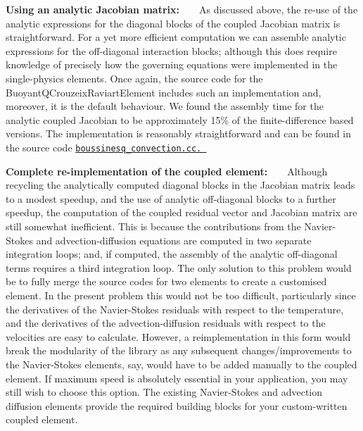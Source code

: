 \begin{DoxyItemize}
\begin{DoxyEnumerate}
\item {\bfseries Using an analytic Jacobian matrix\+:} ~\newline
~\newline
 As discussed above, the re-\/use of the analytic expressions for the diagonal blocks of the coupled Jacobian matrix is straightforward. For a yet more efficient computation we can assemble analytic expressions for the off-\/diagonal interaction blocks; although this does require knowledge of precisely how the governing equations were implemented in the single-\/physics elements. Once again, the source code for the {\ttfamily Buoyant\+Q\+Crouzeix\+Raviart\+Element} includes such an implementation and, moreover, it is the default behaviour. We found the assembly time for the analytic coupled Jacobian to be approximately 15\% of the finite-\/difference based versions. The implementation is reasonably straightforward and can be found in the source code \href{../../../../demo_drivers/multi_physics/boussinesq_convection/boussinesq_convection.cc}{\tt boussinesq\+\_\+convection.\+cc. } ~\newline
~\newline

\item {\bfseries Complete re-\/implementation of the coupled element\+:} ~\newline
~\newline
 Although recycling the analytically computed diagonal blocks in the Jacobian matrix leads to a modest speedup, and the use of analytic off-\/diagonal blocks to a further speedup, the computation of the coupled residual vector and Jacobian matrix are still somewhat inefficient. This is because the contributions from the Navier-\/\+Stokes and advection-\/diffusion equations are computed in two separate integration loops; and, if computed, the assembly of the analytic off-\/diagonal terms requires a third integration loop. The only solution to this problem would be to fully merge the source codes for two elements to create a customised element. In the present problem this would not be too difficult, particularly since the derivatives of the Navier-\/\+Stokes residuals with respect to the temperature, and the derivatives of the advection-\/diffusion residuals with respect to the velocities are easy to calculate. However, a reimplementation in this form would break the modularity of the library as any subsequent changes/improvements to the Navier-\/\+Stokes elements, say, would have to be added manually to the coupled element. If maximum speed is absolutely essential in your application, you may still wish to choose this option. The existing Navier-\/\+Stokes and advection diffusion elements provide the required building blocks for your custom-\/written coupled element. ~\newline
~\newline

\end{DoxyEnumerate}
\end{DoxyItemize}

